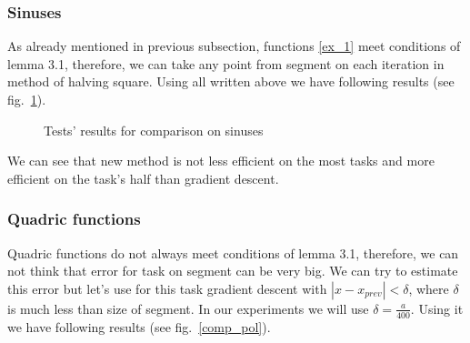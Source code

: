 \documentclass[12pt]{article}
\begin{document}
\subsubsection{Sinuses}  

As already mentioned in previous subsection, functions \eqref{ex_1} meet conditions of lemma 3.1, therefore, we can take any point from segment on each iteration in method of halving square. Using all written above we have following results (see fig.~\ref{comp_sinuses}).

\begin{figure}[h!]
\caption{Tests' results for comparison on sinuses}
\label{comp_sinuses}
\end{figure}

We can see that new method is not less efficient on the most tasks and more efficient on the task's half than gradient descent.

\subsubsection{Quadric functions}

Quadric functions do not always meet conditions of lemma 3.1, therefore, we can not think that error for task on segment can be very big. We can try to estimate this error but let's use for this task gradient descent with $|x-x_{prev}|<\delta$, where $\delta$ is much less than size of segment. In our experiments we will use $\delta = \frac{a}{400}$. Using it we have following results (see fig.~\ref{comp_pol}).
\end{document}
